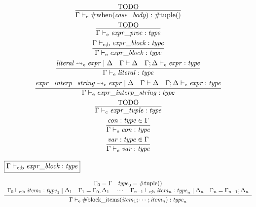 \begin{gather*}
    \infer{\Gamma \vdash_\mathrm{e} \mathrm{\#when}(\mathit{case\_body}): \mathrm{\#tuple}()}{
        \text{TODO}
    }
    \\
    \infer{\Gamma \vdash_\mathrm{e} \mathit{expr\_proc}: \mathit{type}}{
        \text{TODO}
    }
    \\
    \infer{\Gamma \vdash_\mathrm{e} \mathit{expr\_block}: \mathit{type}}{
        \Gamma \vdash_{\mathrm{e}; \mathrm{b}} \mathit{expr\_block}: \mathit{type}
    }
    \\
    \infer{\Gamma \vdash_\mathrm{e} \mathit{literal}: \mathit{type}}{
        \mathit{literal} \rightsquigarrow_\mathrm{e} \mathit{expr} \mid \Delta
        &
        \Gamma \vdash \Delta
        &
        \Gamma; \Delta \vdash_\mathrm{e} \mathit{expr}: \mathit{type}
    }
    \\
    \infer{\Gamma \vdash_\mathrm{e} \mathit{expr\_interp\_string}: \mathit{type}}{
        \mathit{expr\_interp\_string} \rightsquigarrow_\mathrm{e} \mathit{expr} \mid \Delta
        &
        \Gamma \vdash \Delta
        &
        \Gamma; \Delta \vdash_\mathrm{e} \mathit{expr}: \mathit{type}
    }
    \\
    \infer{\Gamma \vdash_\mathrm{e} \mathit{expr\_tuple}: \mathit{type}}{
        \text{TODO}
    }
    \\
    \infer{\Gamma \vdash_\mathrm{e} \mathit{con}: \mathit{type}}{
        \mathit{con}: \mathit{type} \in \Gamma
    }
    \\
    \infer{\Gamma \vdash_\mathrm{e} \mathit{var}: \mathit{type}}{
        \mathit{var}: \mathit{type} \in \Gamma
    }
\end{gather*}

$\fbox{$\Gamma \vdash_{\mathrm{e}; \mathrm{b}} \mathit{expr\_block}: \mathit{type}$}$

\begin{gather*}
    \infer{\Gamma \vdash_\mathrm{e} \mathrm{\#block\_items}(\mathit{item}_1; \cdots; \mathit{item}_n): \mathit{type}_n}{
        \begin{array}{c}
            \Gamma_0 = \Gamma
            \hspace{1em}
            \mathit{type}_0 = \mathrm{\#tuple}()
            \\
            \Gamma_0 \vdash_{\mathrm{e}; \mathrm{b}} \mathit{item}_1: \mathit{type}_1 \mid \Delta_1
            \hspace{1em}
            \Gamma_1 = \Gamma_0; \Delta_1
            \hspace{1em}
            \cdots
            \hspace{1em}
            \Gamma_{n - 1} \vdash_{\mathrm{e}; \mathrm{b}} \mathit{item}_n: \mathit{type}_n \mid \Delta_n
            \hspace{1em}
            \Gamma_n = \Gamma_{n - 1}; \Delta_n
        \end{array}
    }
\end{gather*}

